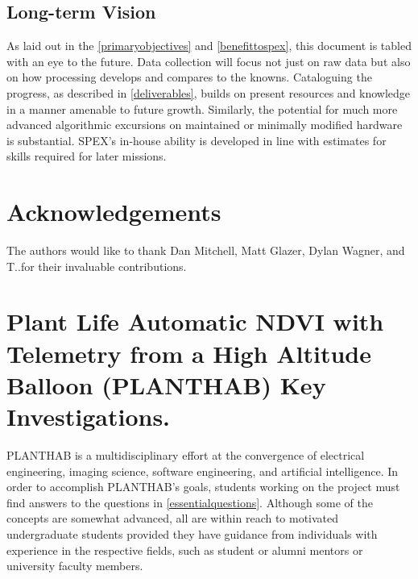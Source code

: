 \documentclass[conference]{IEEEtran} %
\begin{document}
\subsection{Long-term Vision}
As laid out in the \autoref{primaryobjectives} and \autoref{benefittospex}, this document is tabled with an eye to the future. Data collection will focus not just on raw data but also on how processing develops and compares to the knowns. 
Cataloguing the progress, as described in \autoref{deliverables}, builds on present resources and knowledge in a manner amenable to future growth. 
Similarly, the potential for much more advanced algorithmic excursions on maintained or minimally modified hardware is substantial. 
SPEX's in-house ability is developed in line with estimates for skills required for later missions. 


\section*{Acknowledgements}
The authors would like to thank Dan Mitchell, Matt Glazer, Dylan Wagner, and T.\@J.\@Tarazevits for their invaluable contributions. 




\onecolumn
\appendices{}


\section{Plant Life Automatic NDVI with Telemetry from a High Altitude Balloon (PLANTHAB) Key Investigations.}
PLANTHAB is a multidisciplinary effort at the convergence of electrical engineering, imaging science, software engineering, and artificial intelligence. 
In order to accomplish PLANTHAB's goals, students working on the project must find answers to the questions in \autoref{essentialquestions}.
Although some of the concepts are somewhat advanced, all are within reach to motivated undergraduate students provided they have guidance from individuals with experience in the respective fields, such as student or alumni mentors or university faculty members.
\end{document}
